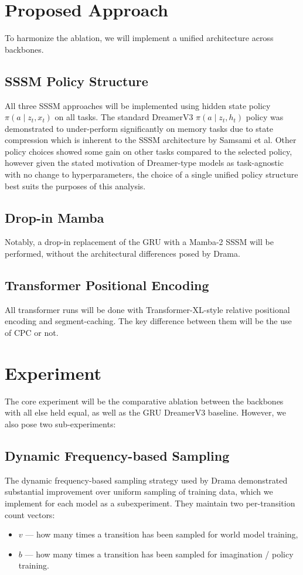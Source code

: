 \documentclass{article}
\begin{document}
\section{Proposed Approach}
To harmonize the ablation, we will implement a unified architecture across backbones.

\subsection{SSSM Policy Structure}
All three SSSM approaches will be implemented using hidden state policy \(\pi(a \mid z_t, x_t)\) on all tasks. The standard DreamerV3 \(\pi(a \mid z_t, h_t)\) policy was demonstrated to under-perform significantly on memory tasks due to state compression which is inherent to the SSSM architecture by Samsami et al.\cite{memory} Other policy choices showed some gain on other tasks compared to the selected policy, however given the stated motivation of Dreamer-type models as task-agnostic with no change to hyperparameters, the choice of a single unified policy structure best suits the purposes of this analysis.

\subsection{Drop-in Mamba}
Notably, a drop-in replacement of the GRU with a Mamba-2 SSSM\cite{mamba2} will be performed, without the architectural differences posed by Drama\cite{drama}.

\subsection{Transformer Positional Encoding}
All transformer runs will be done with Transformer-XL-style\cite{transformerxl} relative positional encoding and segment-caching. The key difference between them will be the use of CPC or not.

\section{Experiment}
The core experiment will be the comparative ablation between the backbones with all else held equal, as well as the GRU DreamerV3 baseline. However, we also pose two sub-experiments:

\subsection{Dynamic Frequency-based Sampling}
The dynamic frequency-based sampling strategy used by Drama\cite{drama} demonstrated substantial improvement over uniform sampling of training data, which we implement for each model as a subexperiment. They maintain two per-transition count vectors:
\begin{itemize}
    \item \(v\) --- how many times a transition has been sampled for world model training,
    \item \(b\) --- how many times a transition has been sampled for imagination / policy training.
\end{itemize}
\end{document}

